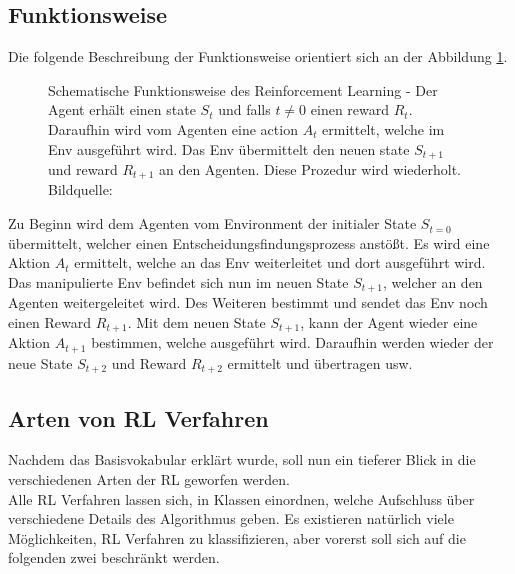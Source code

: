 \subsection{Funktionsweise} \label{subsec:Grundlagen_Funktionsweise}
Die folgende Beschreibung der Funktionsweise orientiert sich an der Abbildung \ref{fig:Grundlagen_Reinforcement_Learning}.
\begin{figure}[H]
	\centering
	
	\caption[Reinforcement Learning]{Schematische Funktionsweise des Reinforcement Learning - Der Agent erhält einen state $S_{t}$ und falls 
		$t \neq 0$ einen reward $R_{t}$. Daraufhin wird vom Agenten eine action $A_{t}$ ermittelt, welche im Env ausgeführt wird. Das Env übermittelt den neuen state $S_{t+1}$ und reward $R_{t+1}$ an den Agenten. Diese Prozedur wird wiederholt. Bildquelle: \citep[S. 38]{Sutton1998}}
	\label{fig:Grundlagen_Reinforcement_Learning}
\end{figure}
Zu Beginn wird dem Agenten vom Environment der initialer State $S_{t=0}$ übermittelt, welcher einen Entscheidungsfindungsprozess anstößt. Es wird eine Aktion $A_{t}$ ermittelt, welche an das Env weiterleitet und dort ausgeführt wird.
Das manipulierte Env befindet sich nun im neuen State $S_{t+1}$, welcher an den Agenten weitergeleitet wird. Des Weiteren bestimmt und sendet das Env noch einen Reward $R_{t+1}$.
Mit dem neuen State $S_{t+1}$, kann der Agent wieder eine Aktion $A_{t+1}$ bestimmen, welche ausgeführt wird. Daraufhin werden wieder der neue State $S_{t+2}$ und Reward $R_{t+2}$ ermittelt und übertragen usw. \citep[S. 37 ff.]{Sutton1998}

\subsection{Arten von RL Verfahren} \label{subsec:Grundlagen_Arten_RL_Verfahren}
Nachdem das Basisvokabular erklärt wurde, soll nun ein tieferer Blick in die verschiedenen Arten der RL geworfen werden.\\
Alle RL Verfahren lassen sich, in Klassen einordnen, welche Aufschluss über verschiedene Details des Algorithmus geben. Es existieren natürlich viele Möglichkeiten, RL Verfahren zu klassifizieren, aber vorerst soll sich auf die folgenden zwei beschränkt werden.

